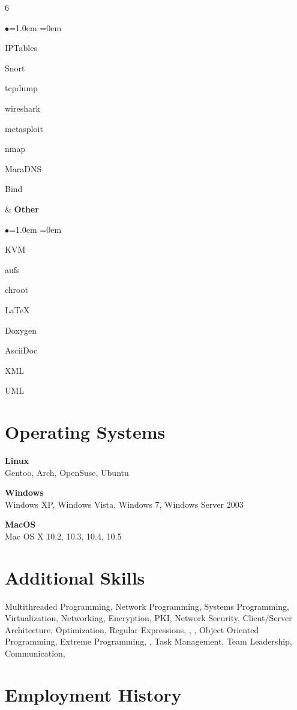 \documentclass[margin,line]{resume}
\newenvironment{skills}{
  \begin{list}{\small$\bullet$}{\leftmargin=1.0em \itemindent=0em \small}
}{
  \end{list}
}
\begin{document}
\begin{resume}
\begin{ncolumn}{6}
\begin{skills}
  \item IPTables
  \item Snort
  \item tcpdump
  \item wireshark
  \item metasploit
  \item nmap
  \item MaraDNS
  \item Bind
  \end{skills}
&
{\small\bf Other}
  \begin{skills}
  \item KVM
  \item aufs
  \item chroot
  \item \LaTeX
  \item Doxygen
  \item AsciiDoc
  \item XML
  \item UML
  \end{skills}
\end{ncolumn}

\section{Operating Systems}
{\bf Linux}\\
Gentoo, Arch, OpenSuse, Ubuntu

{\bf Windows}\\
Windows XP, Windows Vista, Windows 7, Windows Server 2003

{\bf MacOS}\\
Mac OS X 10.2, 10.3, 10.4, 10.5

\section{Additional Skills}
Multithreaded Programming, Network Programming, Systems Programming,
Virtualization, Networking, Encryption, PKI, Network Security, Client/Server
Architecture, Optimization, Regular Expressions, , , Object Oriented
Programming, Extreme Programming, , Task Management, Team Leadership,
Communication,


\section{Employment History}


\end{resume}
\end{document}
